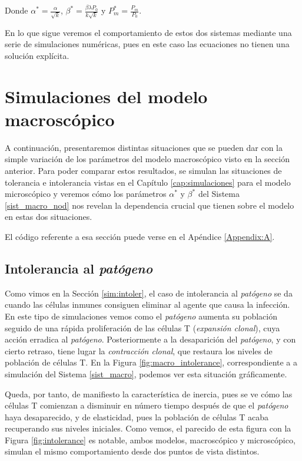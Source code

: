 Donde $\alpha^{*} = \frac{\alpha}{\sqrt k}$, $\beta^{*} = \frac{\beta \lambda P_0}{k \sqrt k}$ y $P_{m}^{*} = \frac{P_m}{P_0}$.

En lo que sigue veremos el comportamiento de estos dos sistemas mediante una serie de simulaciones numéricas, pues en este caso las ecuaciones no tienen una solución explícita.

\section{Simulaciones del modelo macroscópico}
\label{sec:simu_macro}

A continuación, presentaremos distintas situaciones que se pueden dar con la simple variación de los parámetros del modelo macroscópico visto en la sección anterior. Para poder comparar estos resultados, se simulan las situaciones de tolerancia e intolerancia vistas en el Capítulo \ref{cap:simulaciones} para el modelo microscópico y veremos cómo los parámetros $\alpha^{*}$ y $\beta^{*}$ del Sistema \ref{sist_macro_nod} nos revelan la dependencia crucial que tienen sobre el modelo en estas dos situaciones.

El código referente a esa sección puede verse en el Apéndice \ref{Appendix:A}.



\subsection{Intolerancia al \textit{patógeno}}
\label{sub:simMacroIntoler}

Como vimos en la Sección \ref{sim:intoler}, el caso de intolerancia al \textit{patógeno} se da cuando las células inmunes consiguen eliminar al agente que causa la infección. 
En este tipo de simulaciones vemos como el \textit{patógeno} aumenta su población seguido de una rápida proliferación de las células T (\textit{expansión clonal}), cuya acción erradica al \textit{patógeno}. Posteriormente a la desaparición del \textit{patógeno}, y con cierto retraso, tiene lugar la \textit{contracción clonal}, que restaura los niveles de población de células T. En la Figura \ref{fig:macro_intolerance}, correspondiente a a simulación del Sistema \ref{sist_macro}, podemos ver esta situación gráficamente. 

Queda, por tanto, de manifiesto la característica de inercia, pues se ve cómo las células T comienzan a disminuir en número tiempo después de que el \textit{patógeno} haya desaparecido, y de elasticidad, pues la población de células T acaba recuperando sus niveles iniciales. Como vemos, el parecido de esta figura con la Figura \ref{fig:intolerance} es notable, ambos modelos, macroscópico y microscópico, simulan el mismo comportamiento desde dos puntos de vista distintos.


